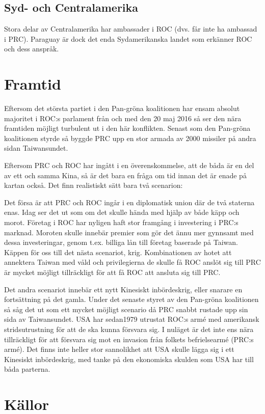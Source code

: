 \documentclass[a4paper,10pt]{article}
\begin{document}
\subsection*{Syd- och Centralamerika}
Stora delar av Centralamerika har ambassader i ROC (dvs. får inte ha ambassad i PRC). Paraguay är dock det enda Sydamerikanska landet som erkänner ROC och dess anspråk.

\section*{Framtid}
Eftersom det största partiet i den Pan-gröna koalitionen har ensam absolut majoritet i ROC:s parlament från och med den 20 maj 2016 så ser den nära framtiden möjligt turbulent ut i den här konflikten. Senast som den Pan-gröna koalitionen styrde så byggde PRC upp en stor armada av 2000 missiler på andra sidan Taiwansundet.

Eftersom PRC och ROC har ingått i en överenskommelse, att de båda är en del av ett och samma Kina, så är det bara en fråga om tid innan det är enade på kartan också. Det finn realistiskt sätt bara två scenarion:

Det försa är att PRC och ROC ingår i en diplomatisk union där de två staterna enas. Idag ser det ut som om det skulle hända med hjälp av både käpp och morot. Företag i ROC har nyligen haft stor framgång i investering i PRC:s marknad. Moroten skulle innebär premier som gör det ännu mer gynnsamt med dessa investeringar, genom t.ex. billiga lån till företag baserade på Taiwan. Käppen för oss till det nästa scenariot, krig. Kombinationen av hotet att annektera Taiwan med våld och privilegierna de skulle få ROC anslöt sig till PRC är mycket möjligt tillräckligt för att få ROC att ansluta sig till PRC.

Det andra scenariot innebär ett nytt Kinesiskt inbördeskrig, eller snarare en fortsättning på det gamla. Under det senaste styret av den Pan-gröna koalitionen så såg det ut som ett mycket möjligt scenario då PRC snabbt rustade upp sin sida av Taiwansundet. USA har sedan1979 utrustat ROC:s armé med amerikansk stridsutrustning för att de ska kunna försvara sig. I nuläget är det inte ens nära tillräckligt för att försvara sig mot en invasion från folkets befrielsearmé (PRC:s armé). Det finns inte heller stor sannolikhet att USA skulle lägga sig i ett Kinesiskt inbördeskrig, med tanke på den ekonomiska skulden som USA har till båda parterna.

\section*{Källor}
\end{document}

